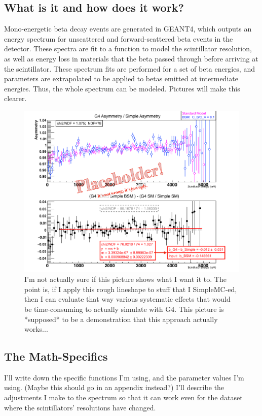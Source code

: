 	\subsection{What is it and how does it work?}
	Mono-energetic beta decay events are generated in GEANT4, which outputs an energy spectrum for unscattered and forward-scattered beta events in the detector.  These spectra are fit to a function to model the scintillator resolution, as well as energy loss in materials that the beta passed through before arriving at the scintillator.  These spectrum fits are performed for a set of beta energies, and parameters are extrapolated to be applied to betas emitted at intermediate energies.  Thus, the whole spectrum can be modeled.  Pictures will make this clearer. 
	
    \begin{figure}[h!!!t]
    	\centering
    	\includegraphics[width=.999\linewidth]
    	{Figures/LineshapeDemo_prelim.pdf}
    	\caption[Lineshape Comparison]{I'm not actually sure if this picture shows what I want it to.  The point is, if I apply this rough lineshape to stuff that I SimpleMC-ed, then I can evaluate that way various systematic effects that would be time-consuming to actually simulate with G4.  This picture is  *supposed* to be a demonstration that this approach actually works...  }	
    	\label{fig:lineshape_demo}
    \end{figure}
	
	\subsection{The Math-Specifics}
	I'll write down the specific functions I'm using, and the parameter values I'm using.  (Maybe this should go in an appendix instead?)  I'll describe the adjustments I make to the spectrum so that it can work even for the dataset where the scintillators' resolutions have changed.
	
